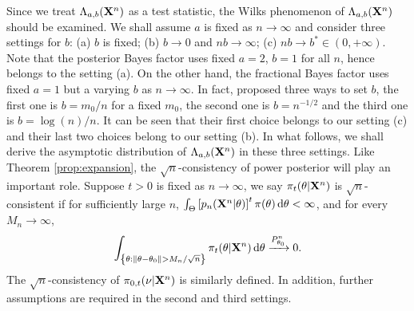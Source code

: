 \documentclass[11pt]{article}
\theoremstyle{plain}
\theoremstyle{definition}
\theoremstyle{remark}
\begin{document}
    Since we treat $\Lambda_{a,b}(\mathbf{X}^n)$ as a test statistic,
    the Wilks phenomenon of $\Lambda_{a,b}(\mathbf{X}^n)$ should be examined.
    We shall assume $a$ is fixed as $n \to \infty$ and consider three settings for $b$: (a)
            $b$ is fixed;
            (b)
            $b \to 0$ and $n b \to \infty$;
            (c)
    $n b \to b^* \in (0, +\infty) $.
    Note that the posterior Bayes factor uses fixed $a=2$, $b=1$ for all $n$, hence belongs to the setting (a).
    On the other hand, the fractional Bayes factor uses fixed $a=1$ but a varying $b$ as $n \to \infty$.
    In fact, \cite{Fractional1995} proposed three ways to set $b$, the first one is $b=m_0/n$ for a fixed $m_0$, the second one is $b=n^{-1/2}$ and the third one is $b=\log ( n) /n$.
    It can be seen that their first choice belongs to our setting (c) and their last two choices belong to our setting (b).
    In what follows, we shall derive the asymptotic distribution of $\Lambda_{a,b}(\mathbf{X}^n)$ in these three settings.
Like Theorem \ref{prop:expansion}, the $\sqrt{n}$-consistency of power posterior will play an important role.
Suppose $t>0$ is fixed as $n \to \infty$, 
we say $\pi_t(\theta | \mathbf{X}^n)$ is $\sqrt n$-consistent if for sufficiently large $n$, $\int_{\Theta} \left[ p_n (\mathbf{X}^n | \theta) \right]^t \pi (\theta) \, \mathrm d \theta < \infty$, and for every $M_n \to \infty$,
\begin{align*}
\int_{ \left\{ \theta: \|\theta - \theta_0\| > M_n / \sqrt n \right\}}\pi_t(\theta | \mathbf{X}^n) \, \mathrm d \theta \xrightarrow{P_{\theta_0}^n} 0.
\end{align*}
The $\sqrt n$-consistency of $\pi_{0,t}(\nu | \mathbf{X}^n)$ is similarly defined.
In addition, further assumptions are required in the second and third settings.
\end{document}
